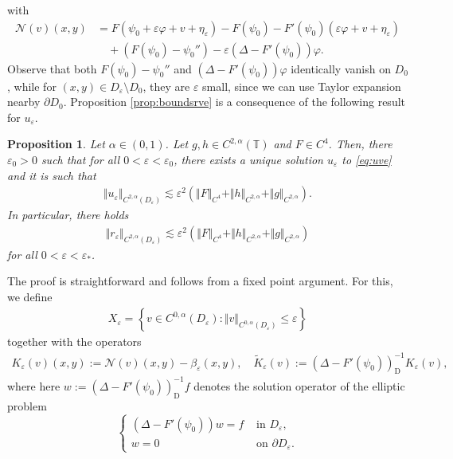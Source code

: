 \documentclass[11pt,reqno]{amsproc}
\newtheorem{proposition}{Proposition}[section]
\newcommand{\N}{\mathcal{N}}
\newcommand{\ve}{\varepsilon}
\numberwithin{equation}{section}
\numberwithin{theorem}{section}
\numberwithin{prop}{section}
\numberwithin{cor}{section}
\numberwithin{lemma}{section}
\theoremstyle{remark}
\theoremstyle{definition}
\begin{document}
with
\begin{equation}\label{eq:defNappendix}
\begin{split}
\N(v)(x,y) &= F(\psi_0 + \ve{\varphi} + v + \eta_\ve) - F(\psi_0) - F'(\psi_0)\left(\ve {\varphi} + v + \eta_\ve\right) \\
&\quad +(F(\psi_0) - \psi_0'') -\ve (\Delta - F'(\psi_0)){\varphi}.
\end{split}
\end{equation}
Observe that both $F(\psi_0)-\psi_0''$ and $(\Delta - F'(\psi_0))\varphi$ identically vanish on $D_0$, while for $(x,y)\in D_\ve\setminus D_0$, they are $\ve$ small, since we can use Taylor expansion nearby $\partial D_0$. Proposition \ref{prop:boundsrve} is a consequence of the following result for $u_\ve$.

\begin{proposition}\label{prop:boundsuve}
Let $\alpha\in (0,1)$. Let $g,h\in C^{2,\alpha}(\mathbb{T})$ and $F\in C^4$. Then, there $\ve_0>0$ such that for all $0<\ve < \ve_0$, there exists a unique solution $u_\ve$ to \eqref{eq:uve} and it is such that
\begin{align*}
\Vert u_\ve \Vert_{C^{2,\alpha}(D_\ve)} \lesssim \ve^2 \left( \Vert F \Vert_{C^4} + \Vert h \Vert_{C^{2,\alpha}} + \Vert g \Vert_{C^{2,\alpha}} \right).
\end{align*}
In particular, there holds
\begin{align*}
\Vert r_\ve \Vert_{C^{2,\alpha}(D_\ve)} \lesssim \ve^2 \left( \Vert F \Vert_{C^4} + \Vert h \Vert_{C^{2,\alpha}} + \Vert g \Vert_{C^{2,\alpha}} \right)
\end{align*}
for all $0 < \ve < \ve_*$.
\end{proposition} 

The proof is straightforward and follows from a fixed point argument. For this, we define 
\begin{align*}
X_\ve = \left \lbrace v\in C^{0,\alpha}(D_\ve) : \Vert v \Vert_{C^{0,\alpha}(D_\ve)} \leq  \ve \right\rbrace
\end{align*}
together with the operators 
\begin{align*}\label{def:K}
K_\ve(v)(x,y) := \N(v)(x,y) - \beta_{\ve}(x,y), \quad \widetilde{K}_\ve(v) := (\Delta- F'(\psi_0))_{\mathrm{D}}^{-1}K_\ve(v),
\end{align*}
where here $w:=(\Delta- F'(\psi_0))_{\mathrm{D}}^{-1}f$ denotes the solution operator of the elliptic problem
\begin{equation}\label{eq:w}
\begin{cases}
\left(\Delta-F'(\psi_0)\right)w = f   & \text{ in } D_\ve, \\
w = 0 & \text{ on } \partial D_\ve.
\end{cases}
\end{equation}
\end{document}
